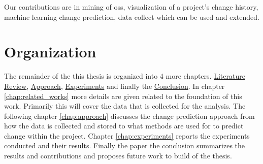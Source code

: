 Our contributions are in mining of \gls{oss}, visualization of a project's change history, machine learning change prediction, data collect which can be used and extended.

\section{Organization}

The remainder of the this thesis is organized into 4 more chapters. \hyperref[chap:related_works]{Literature Review}, \hyperref[chap:approach]{Approach}, \hyperref[chap:experiments]{Experiments} and finally the \hyperref[chap:conclusions]{Conclusion}. In chapter \ref{chap:related_works} more details are given related to the foundation of this work. Primarily this will cover the data that is collected for the analysis. The following chapter \ref{chap:approach} discusses the change prediction approach from how the data is collected and stored to what methods are used for to predict change within the project. Chapter \ref{chap:experiments} reports the experiments conducted and their results. Finally the paper the conclusion summarizes the results and contributions and proposes future work to build of the thesis.